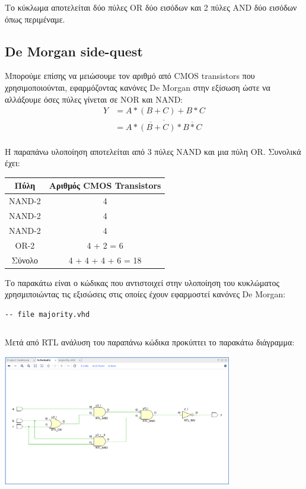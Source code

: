 \documentclass[]{article}
\begin{document}
Το κύκλωμα αποτελείται δύο πύλες OR δύο εισόδων και 2 πύλες AND δύο εισόδων όπως περιμέναμε.

\subsection{De Morgan side-quest}
Μπορούμε επίσης να μειώσουμε τον αριθμό από CMOS transistors που χρησιμοποιούνται, εφαρμόζοντας κανόνες De Morgan στην εξίσωση ώστε να αλλάξουμε όσες πύλες γίνεται σε NOR και NAND:
\begin{align*}
	Y & = A * (B + C) + B * C                                  \\
	  & = \overline{\overline{A * (B + C)} * \overline{B * C}} \\
\end{align*}

Η παραπάνω υλοποίηση αποτελείται από 3 πύλες NAND και μια πύλη OR.
Συνολικά έχει:
\begin{center}
	\begin{tabular}{| c | c |}
		\hline Πύλη   & Αριθμός CMOS Transistors \\
		\hline NAND-2 & 4                        \\
		NAND-2        & 4                        \\
		NAND-2        & 4                        \\
		OR-2          & 4 + 2 = 6                \\
		\hline Σύνολο & 4 + 4 + 4 + 6 = 18       \\
		\hline
	\end{tabular}
\end{center}

Το παρακάτω είναι ο κώδικας που αντιστοιχεί στην υλοποίηση του κυκλώματος χρησμιποιώντας τις εξισώσεις στις οποίες έχουν εφαρμοστεί κανόνες De Morgan:
\begin{verbatim}
-- file majority.vhd
\end{verbatim}
\inputminted{vhdl}{./assign_1/majority.vhdl}

Μετά από RTL ανάλυση του παραπάνω κώδικα προκύπτει το παρακάτω διάγραμμα:
\begin{center}
	\includegraphics[width=10cm]{rtl_new.png}
\end{center}
\end{document}
